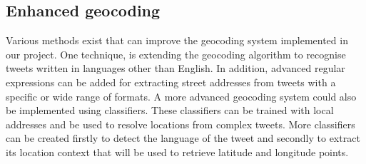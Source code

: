 \subsection{Enhanced geocoding}
Various methods exist that can improve the geocoding system implemented in our project. One technique, is extending the geocoding algorithm to recognise tweets written in languages other than English. In addition, advanced regular expressions can be added for extracting street addresses from tweets with a specific or wide range of formats. A more advanced geocoding system could also be implemented using classifiers. These classifiers can be trained with local addresses and be used to resolve locations from complex tweets. More classifiers can be created firstly to detect the language of the tweet and secondly to extract its location context that will be used to retrieve latitude and longitude points.
